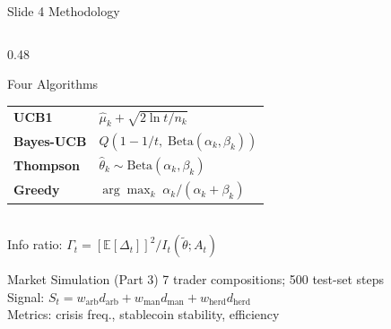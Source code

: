 \documentclass[aspectratio=169, 10pt]{beamer}
\begin{document}
\begin{frame}[t]{Slide 4 \quad Methodology}
\begin{columns}[T]
\begin{column}{0.48\textwidth}
    \vspace{3pt}
    \begin{block}{\small Four Algorithms}
    \vspace{1pt}
    \footnotesize
    \begin{tabular}{>{\bfseries}p{1.8cm} p{4.0cm}}
    UCB1     & $\hat\mu_k + \sqrt{2\ln t / n_k}$ \\
    Bayes-UCB & $Q(1-1/t,\;\mathrm{Beta}(\alpha_k,\beta_k))$ \\
    Thompson  & $\hat\theta_k \sim \mathrm{Beta}(\alpha_k,\beta_k)$ \\
    Greedy    & $\arg\max_k\;\alpha_k/(\alpha_k+\beta_k)$ \\
    \end{tabular}\\[2pt]
    Info ratio: $\Gamma_t = [\mathbb{E}[\Delta_t]]^2 / I_t(\tilde\theta; A_t)$
    \vspace{1pt}
    \end{block}

    \vspace{3pt}
    \begin{block}{\small Market Simulation (Part 3)}
    \vspace{1pt}
    \footnotesize
    7 trader compositions; 500 test-set steps\\
    Signal: $S_t = w_\text{arb}d_\text{arb} + w_\text{man}d_\text{man} + w_\text{herd}d_\text{herd}$\\
    Metrics: crisis freq., stablecoin stability, efficiency
    \vspace{1pt}
    \end{block}
  \end{column}

\end{columns}
\end{frame}
\end{document}

